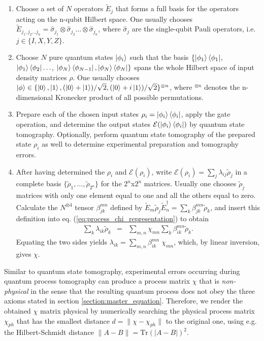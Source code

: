 \begin{enumerate}
\item Choose a set of $N$ operators $\tilde{E}_j$ that forms a full basis for the operators acting on the n-qubit Hilbert space. One usually chooses $\tilde{E}_{j_1,j_2 \hdots j_n} = \hat{\sigma}_{j_1}\otimes \hat{\sigma}_{j_2}\hdots\otimes\hat{\sigma}_{j_n}$, where $\hat{\sigma}_j$ are the single-qubit Pauli operators, i.e. $j\in\{I,X,Y,Z\}$.
\item Choose $N$ pure quantum states $\left| \phi_i \right>$ such that the basis $\{\left| \phi_1 \right>\left< \phi_1 \right|$, $\left| \phi_1 \right>\left< \phi_2 \right|\hdots$, $\left| \phi_{N} \right>\left< \phi_{N-1} \right|,\left| \phi_{N} \right>\left< \phi_{N} \right|\}$ spans the whole Hilbert space of input density matrices $\rho$. One usually chooses $\left| \phi \right> \in \{\left| 0 \right>,\left| 1 \right>,(\left| 0 \right>+\left| 1 \right>)/\sqrt{2},(\left| 0 \right>+i\left| 1 \right>)/\sqrt{2}\}^{\otimes n}$, where $^{\otimes n}$ denotes the n-dimensional Kronecker product of all possible permutations.
\item Prepare each of the chosen input states $\rho_i = \left| \phi_i \right>\left< \phi_i \right|$, apply the gate operation, and determine the output states $\mathcal{E}(\left| \phi_i \right>\left< \phi_i \right|)$ by quantum state tomography. Optionally, perform quantum state tomography of the prepared state $\rho_i$ as well to determine experimental preparation and tomography errors.
\item After having determined the $\rho_i$ and $\mathcal{E}(\rho_i)$, write $\mathcal{E}(\rho_i) = \sum_j \lambda_{ij} \tilde{\rho}_j$  in a complete basis $\{\tilde{\rho}_1,\hdots,\tilde{\rho}_{2^n}\}$ for the $2^n$x$2^n$ matrices. Usually one chooses $\tilde{\rho}_j$ matrices with only one element equal to one and all the others equal to zero.
 Calculate the $N^{\otimes 4}$ tensor $\beta_{jk}^{mn}$ defined by $\tilde{E}_m \tilde{\rho}_j \tilde{E}_n^\dagger = \sum_k \beta_{jk}^{mn}\tilde{\rho}_k$, and insert this definition into eq. (\ref{eq:process_chi_representation}) to obtain
%
\begin{eqnarray}
\sum\limits_k \lambda_{ik} \tilde{\rho}_k & = & \sum\limits_{m,n} \chi_{mn} \sum\limits_k \beta_{ik}^{mn} \tilde{\rho}_k .
\end{eqnarray}
%
Equating the two sides yields $\lambda_{ik} = \sum_{m,n}\beta_{ik}^{mn}\; \chi_{mn}$, which, by linear inversion,  gives $\chi$.

\end{enumerate}



\smallskip

Similar to quantum state tomography, experimental errors occurring during quantum process tomography can produce a process matrix $\chi$ that is {\it non-physical} in the sense that the resulting quantum process does not obey the three axioms stated in section \ref{section:master_equation}. Therefore, we render the obtained $\chi$ matrix physical by numerically searching the  physical process matrix $\chi_{ph}$ that has the smallest distance $d=\|\chi-\chi_{ph}\|$  to the original one, using e.g. the Hilbert-Schmidt distance $\|A-B\| = \mathrm{Tr}(|A-B|)^2$. 

